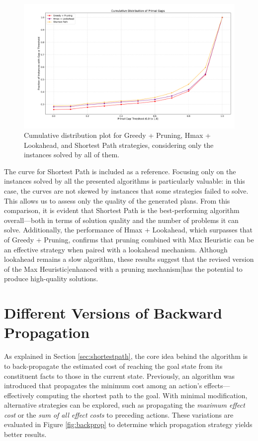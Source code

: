 \begin{figure}[ht]
	\centering
	\includegraphics[width=\textwidth]{images/algs234_solved_all.png}
	\caption{Cumulative distribution plot for Greedy + Pruning, Hmax + Lookahead, and Shortest Path strategies,
		considering only the instances solved by all of them.}
	\label{fig:algs234_solved_all}
\end{figure}

The curve for Shortest Path is included as a reference. Focusing only on the instances solved by all the presented algorithms
is particularly valuable: in this case, the curves are not skewed by instances that some strategies failed to solve.
This allows us to assess only the quality of the generated plans. From this comparison, it is evident that Shortest Path
is the best-performing algorithm overall—both in terms of solution quality and the number of problems it can solve.
Additionally, the performance of Hmax + Lookahead, which surpasses that of Greedy + Pruning, confirms that pruning combined
with Max Heuristic can be an effective strategy when paired with a lookahead mechanism.
Although lookahead remains a slow algorithm, these results suggest that the revised version of the Max Heuristic|enhanced
with a pruning mechanism|has the potential to produce high-quality solutions.

\section{Different Versions of Backward Propagation}
As explained in Section \ref{sec:shortestpath}, the core idea behind the algorithm is to back-propagate the estimated cost
of reaching the goal state from its constituent facts to those in the current state. Previously, an algorithm was introduced
that propagates the minimum cost among an action's effects—effectively computing the shortest path to the goal.
With minimal modification, alternative strategies can be explored, such as propagating the \textit{maximum effect cost} or the
\textit{sum of all effect costs} to preceding actions. These variations are evaluated in Figure \ref{fig:backprop} to determine which
propagation strategy yields better results.

